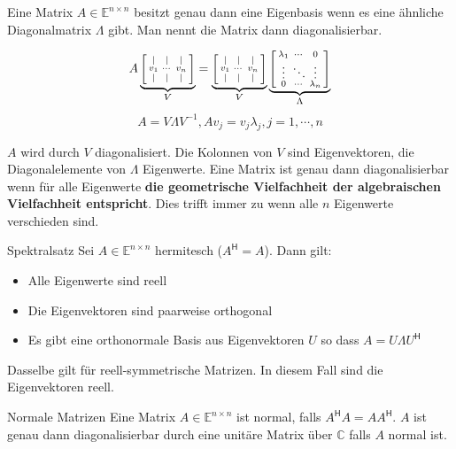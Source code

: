 \documentclass[a4paper,10pt]{article}
\newcommand*{\hermconj}{\mathsf{H}}
\def\C{\mathbb{C}}
\def\E{\mathbb{E}}
\begin{document}
Eine Matrix $A \in \E^{n \times n}$ besitzt genau dann eine Eigenbasis wenn es eine ähnliche Diagonalmatrix $\Lambda$ gibt. Man nennt die Matrix dann diagonalisierbar.

$$A \underbrace{\begin{bsmallmatrix}
  \vert & \vert & \vert \\
  v_1   & \cdots & v_n   \\
  \vert & \vert & \vert
\end{bsmallmatrix}}_V = \underbrace{\begin{bsmallmatrix}
  \vert & \vert & \vert \\
  v_1   & \cdots & v_n   \\
  \vert & \vert & \vert
\end{bsmallmatrix}}_V \underbrace{\begin{bsmallmatrix}
  \lambda_1 & \cdots & 0 \\
  \vdots & \ddots & \vdots \\
  0 & \cdots & \lambda_n
\end{bsmallmatrix}}_\Lambda$$ $$ A = V \Lambda V^{-1}, Av_j = v_j \lambda_j, j = 1, \cdots, n$$

$A$ wird durch $V$ diagonalisiert. Die Kolonnen von $V$ sind Eigenvektoren, die Diagonalelemente von $\Lambda$ Eigenwerte. Eine Matrix ist genau dann diagonalisierbar wenn für alle Eigenwerte \textbf{die geometrische Vielfachheit der algebraischen Vielfachheit entspricht}. Dies trifft immer zu wenn alle $n$ Eigenwerte verschieden sind.

\begin{subbox}{Spektralsatz}
  Sei $A \in \E^{n \times n}$ hermitesch ($A^\hermconj = A$). Dann gilt:
  \begin{itemize}
    \item Alle Eigenwerte sind reell
    \item Die Eigenvektoren sind paarweise orthogonal
    \item Es gibt eine orthonormale Basis aus Eigenvektoren $U$ so dass $A = U \Lambda U^\hermconj$
  \end{itemize}
  Dasselbe gilt für reell-symmetrische Matrizen. In diesem Fall sind die Eigenvektoren reell.
\end{subbox}

\begin{subbox}{Normale Matrizen}
  Eine Matrix $A \in \E^{n \times n}$ ist normal, falls $A^\hermconj A = A A^\hermconj$. $A$ ist genau dann diagonalisierbar durch eine unitäre Matrix über $\C$ falls $A$ normal ist. 
\end{subbox}
\end{document}
